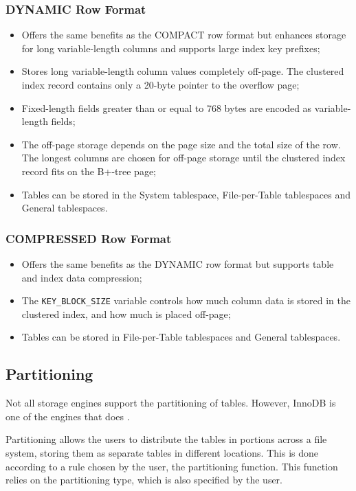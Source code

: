 \documentclass[12pt]{article}
\begin{document}
\subsubsection{DYNAMIC Row Format}
\begin{itemize}
    \item Offers the same benefits as the COMPACT row format but enhances storage for long variable-length columns and supports large index key prefixes;
    \item Stores long variable-length column values completely off-page. The clustered index record contains only a 20-byte pointer to the overflow page;
    \item Fixed-length fields greater than or equal to 768 bytes are encoded as variable-length fields;
    \item The off-page storage depends on the page size and the total size of the row. The longest columns are chosen for off-page storage until the clustered index record fits on the B+-tree page;
    \item Tables can be stored in the System tablespace, File-per-Table tablespaces and General tablespaces.
\end{itemize}


\subsubsection{COMPRESSED Row Format}
\begin{itemize}
    \item Offers the same benefits as the DYNAMIC row format but supports table and index data compression;
    \item The \verb|KEY_BLOCK_SIZE| variable controls how much column data is stored in the clustered index, and how much is placed off-page;
    \item Tables can be stored in File-per-Table tablespaces and General tablespaces.
\end{itemize}



\subsection{Partitioning}
\label{partition}
Not all storage engines support the partitioning of tables. However, InnoDB is one of the engines that does \parencite{PARTITIONING}.

Partitioning allows the users to distribute the tables in portions across a file system, storing them as separate tables in different locations. This is done according to a rule chosen by the user, the partitioning function. This function relies on the partitioning type, which is also specified by the user.
\end{document}

